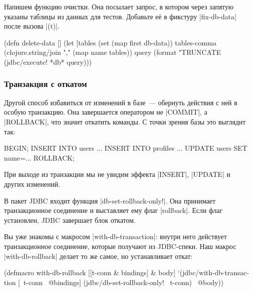 
Напишем функцию очистки. Она посылает запрос, в котором через запятую указаны
таблицы из данных для тестов. Добавьте её в фикстуру \spverb|fix-db-data| после
вызова \spverb|(t)|.

\begin{english}
  \begin{clojure}
(defn delete-data []
  (let [tables (set (map first db-data))
        tables-comma (clojure.string/join "," (map name tables))
        query (format "TRUNCATE %
    (jdbc/execute! *db* query)))
  \end{clojure}
\end{english}

\subsubsection*{Транзакция с откатом}



Другой способ избавиться от изменений в базе~--- обернуть действия с ней в
особую транзакцию. Она завершается оператором не \spverb|COMMIT|, а
\spverb|ROLLBACK|, что значит откатить команды. С точки зрения базы это
выглядит так:

\begin{english}
  \begin{sql}
BEGIN;
INSERT INTO users ...
INSERT INTO profiles ...
UPDATE users SET name=...
ROLLBACK;
  \end{sql}
\end{english}

При выходе из транзакции мы не увидим эффекта \spverb|INSERT|, \spverb|UPDATE| и
других изменений.

В пакет JDBC входит функция \spverb|db-set-rollback-only!|. Она принимает
транзакционное соединение и выставляет ему флаг \spverb|rollback|. Если флаг
установлен, JDBC завершает блок откатом.


Вы уже знакомы с макросом \spverb|with-db-transaction|: внутри него действует
транзакционное соединение, которые получают из JDBC-спеки. Наш макрос
\spverb|with-db-rollback| делает то же самое, но устанавливает откат:

\begin{english}
  \begin{clojure}
(defmacro with-db-rollback
  [[t-conn & bindings] & body]
  `(jdbc/with-db-transaction [~t-conn ~@bindings]
     (jdbc/db-set-rollback-only! ~t-conn)
     ~@body))
  \end{clojure}
\end{english}

